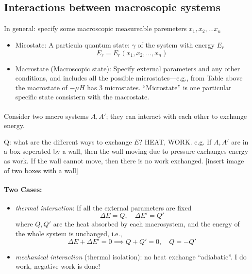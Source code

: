 \documentclass[../main.tex]{subfiles}
\begin{document}
\newpage
{}
\subsection{Interactions between macroscopic systems} 

\paragraph*{} In general: specify some macroscopic measureable paremeters $x_1, x_2, \dots x_n$

\begin{itemize}
    \item Micostate: A particula quantum state: $\gamma$ of the system with energy $E_r$
    \[E_r = E_r(x_1, x_2,\dots, x_n)\]
    \item Macrostate (Macroscopic state): Specify external parameters and any other conditions, and includes all the possible microstates—e.g., from Table above the macrostate of $-\mu H$ has 3 microstates.
    ``Microstate'' is one particular specific state consistern with the macrostate.
\end{itemize}

\paragraph{} Consider two macro systems $A, A'$; they can interact with each other to exchange energy.

Q: what are the different ways to exchange $E$? HEAT, WORK.
e.g. If $A, A'$ are in a box seperated by a wall, then the wall moving due to pressure exchanges energy as work. If the wall cannot move, then there is no work exchanged.
[insert image of two boxes with a wall]
\paragraph*{Two Cases:}
\begin{itemize}
    \item  \emph{thermal interaction}: If all the external parameters are fixed
    \[\Delta E = Q, \quad \Delta E' = Q'\]
    where $Q, Q'$ are the heat absorbed by each macrosystem, and the energy of the whole system is unchanged, i.e.,
    \[\Delta E + \Delta E' = 0 \implies Q + Q' = 0, \quad Q = -Q'\]
    \item \emph{mechanical interaction} (thermal isolation): no heat exchange ``adiabatic''. I do work, negative work is done!
\end{itemize}
\end{document}
